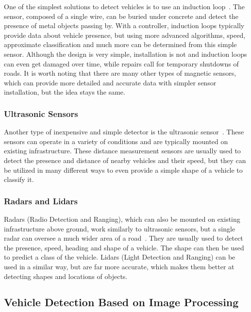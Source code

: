 One of the simplest solutions to detect vehicles is to use an induction
loop~\cite{MagneticSensors}. The sensor, composed of a single wire, can be buried
under concrete and detect the presence of metal objects passing by. With a
controller, induction loops typically provide data about vehicle presence, but
using more advanced algorithms, speed, approximate classification and much more
can be determined from this simple sensor. Although the design is very simple,
installation is not and induction loops can even get damaged over time, while
repairs call for temporary shutdowns of roads. It is worth noting that there
are many other types of magnetic sensors, which can provide more detailed and
accurate data with simpler sensor installation, but the idea stays the same.


\subsubsection*{Ultrasonic Sensors}

Another type of inexpensive and simple detector is the ultrasonic
sensor~\cite{UltrasonicSensors}. These sensors can operate in a variety of
conditions and are typically mounted on existing infrastructure. These distance
measurement sensors are usually used to detect the presence and distance of nearby
vehicles and their speed, but they can be utilized in many different ways to
even provide a simple shape of a vehicle to classify it.


\subsubsection*{Radars and Lidars}

Radars (Radio Detection and Ranging), which can also be mounted on existing
infrastructure above ground, work similarly to ultrasonic sensors, but a single
radar can oversee a much wider area of a road~\cite{RadarSensors}. They are
usually used to detect the presence, speed, heading and shape of a vehicle. The
shape can then be used to predict a class of the vehicle. Lidars (Light
Detection and Ranging) can be used in a similar way, but are far more accurate,
which makes them better at detecting shapes and locations of objects.



\subsection{Vehicle Detection Based on Image Processing}

